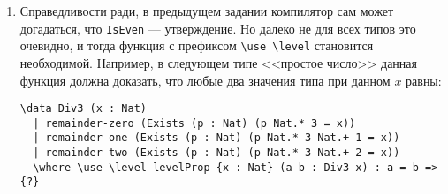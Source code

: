 \documentclass[10pt,a4paper,oneside]{article}
\begin{document}
\begin{enumerate}
Чтобы воспроизвести тот же эффект в конструкции \verb!\case!, нужно указывать ключевое слово 
\verb!\elim! перед каждой элиминируемой переменной: 
\begin{verbatim}
\case \elim n, \elim a, \elim b \with { ... }
\end{verbatim}

Полный код, определяющий тип \verb!IsEven! (вместе с доказательством того, что тип --- утверждение),
выглядит так:

\begin{verbatim}
\data IsEven (n : Nat) \elim n
  | 0 => zero-is-even
  | (suc (suc k)) => next-next (IsEven k)
  \where {
    \func all-even-different ... -- скопируйте код функции сюда
    \use \level is-even-isProp (n : Nat) : isProp (IsEven n) => all-even-different n
  }
\end{verbatim}

Однако, незавершённым остаётся доказательство разрешимости типа \verb!IsEven n!. Восполните лакуны:

\begin{verbatim}
\func even-is-dec (a : Nat) : Dec (IsEven a) \elim a
  | 0 => yes zero-is-even
  | 1 => no {?}
  | suc (suc a) => {?}
\end{verbatim}

\item Справедливости ради, в предыдущем задании компилятор сам может догадаться, что \verb!IsEven! --- утверждение.
Но далеко не для всех типов это очевидно, и тогда функция с префиксом \verb!\use \level! становится необходимой.
Например, в следующем типе <<простое число>> данная функция должна доказать, что любые два значения типа при данном $x$ равны:

\begin{verbatim}
\data Div3 (x : Nat)
  | remainder-zero (Exists (p : Nat) (p Nat.* 3 = x))
  | remainder-one (Exists (p : Nat) (p Nat.* 3 Nat.+ 1 = x))
  | remainder-two (Exists (p : Nat) (p Nat.* 3 Nat.+ 2 = x))
  \where \use \level levelProp {x : Nat} (a b : Div3 x) : a = b => {?}
\end{verbatim}


\end{enumerate}
\end{document}
